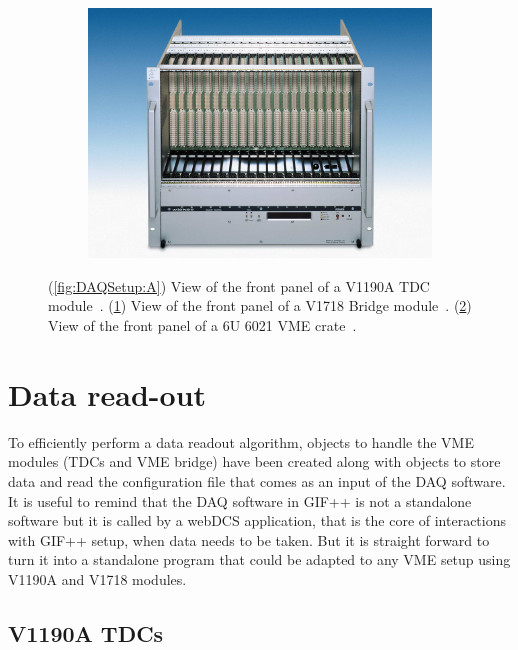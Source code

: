 \begin{figure}[H]
\begin{subfigure}{0.5\linewidth}
			\caption{\label{fig:DAQSetup:B}}
		\end{subfigure}
		\begin{subfigure}{\linewidth}
		    \centering
			\includegraphics[width = 0.8\plotwidth]{fig/app1/Wiener-front.png}
			\caption{\label{fig:DAQSetup:C}}
		\end{subfigure}
		\caption{\label{fig:DAQSetup} (\ref{fig:DAQSetup:A}) View of the front panel of a V1190A TDC module~\cite{V1190AMUT}. (\ref{fig:DAQSetup:B}) View of the front panel of a V1718 Bridge module~\cite{V1718MUT}. (\ref{fig:DAQSetup:C}) View of the front panel of a 6U 6021 VME crate~\cite{6U6000MUT}.}
	\end{figure}

\section{Data read-out}
\label{app1:sec:Data}

	To efficiently perform a data readout algorithm, objects to handle the VME modules (TDCs and VME bridge) have been created along with objects to store data and read the configuration file that comes as an input of the DAQ software.\\
	It is useful to remind that the DAQ software in GIF++ is not a standalone software but it is called by a \acf{webDCS} application, that is the core of interactions with GIF++ setup, when data needs to be taken. But it is straight forward to turn it into a standalone program that could be adapted to any VME setup using V1190A and V1718 modules.\\

    \subsection{V1190A TDCs}
    \label{app1:ssec:V1190A}

